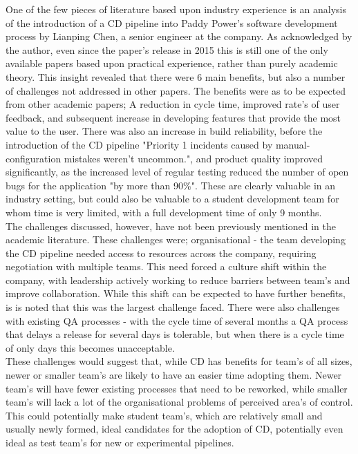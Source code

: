 \documentclass[journal]{IEEEtran}
\begin{document}
One of the few pieces of literature based upon industry experience is an analysis of the introduction of a CD pipeline into Paddy Power's software development process by Lianping Chen\cite{paddy}, a senior engineer at the company. As acknowledged by the author, even since the paper's release in 2015 this is still one of the only available papers based upon practical experience, rather than purely academic theory. This insight revealed that there were 6 main benefits, but also a number of challenges not addressed in other papers. The benefits were as to be expected from other academic papers; A reduction in cycle time, improved rate's of user feedback, and subsequent increase in developing features that provide the most value to the user. There was also an increase in build reliability, before the introduction of the CD pipeline "Priority  1  incidents caused by manual-configuration mistakes weren’t uncommon."\cite[p.51]{paddy}, and product quality improved significantly, as the increased level of regular testing reduced the number of open bugs for the application "by more than 90\%"\cite[p.53]{paddy}. These are clearly valuable in an industry setting, but could also be valuable to a student development team for whom time is very limited, with a full development time of only 9 months.\\
The challenges discussed, however, have not been previously mentioned in the academic literature. These challenges were; organisational - the team developing the CD pipeline needed access to resources across the company, requiring negotiation with multiple teams. This need forced a culture shift within the company, with leadership actively working to reduce barriers between team's and improve collaboration. While this shift can be expected to have further benefits, is is noted that this was the largest challenge faced. There were also challenges with existing QA processes - with the cycle time of several months a QA process that delays a release for several days is tolerable, but when there is a cycle time of only days this becomes unacceptable.\\
These challenges would suggest that, while CD has benefits for team's of all sizes, newer or smaller team's are likely to have an easier time adopting them. Newer team's will have fewer existing processes that need to be reworked, while smaller team's will lack a lot of the organisational problems of perceived area's of control. This could potentially make student team's, which are relatively small and usually newly formed, ideal candidates for the adoption of CD, potentially even ideal as test team's for new or experimental pipelines.
\end{document}
